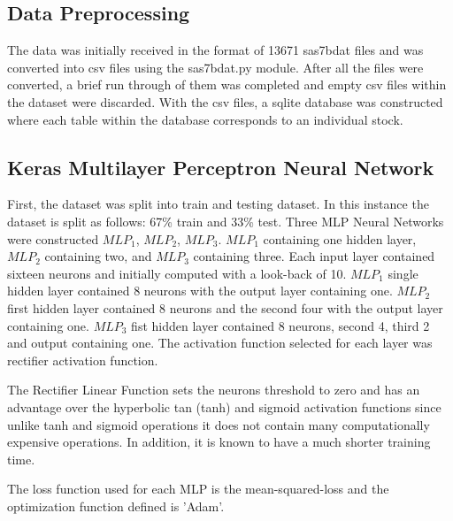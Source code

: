 \subsection{Data Preprocessing}\label{sec:data}


The data was initially received in the format of 13671 sas7bdat files and was converted into csv files using the sas7bdat.py module. After all the files were converted, a brief run through of them was completed and empty csv files within the dataset were discarded. With the csv files, a sqlite database was constructed where each table within the database corresponds to an individual stock. 

\subsection{Keras Multilayer Perceptron Neural Network}\label{sec:data}

First, the dataset was split into train and testing dataset. In this instance the dataset is split as follows: 67\% train and 33\% test. Three MLP Neural Networks were constructed $MLP_1$, $MLP_2$, $MLP_3$. $MLP_1$ containing one hidden layer, $MLP_2$ containing two, and $MLP_3$ containing three. Each input layer contained sixteen neurons and initially computed with a look-back of 10. $MLP_1$ single hidden layer contained 8 neurons with the output layer containing one. $MLP_2$ first hidden layer contained 8 neurons and the second four with the output layer containing one. $MLP_3$ fist hidden layer contained 8 neurons, second 4, third 2 and output containing one. The activation function selected for each layer was rectifier activation function. \cite{brownlee_2017_1}

The Rectifier Linear Function sets the neurons threshold to zero and has an advantage over the hyperbolic tan (tanh) and sigmoid activation functions since unlike tanh and sigmoid operations it does not contain many computationally expensive operations. In addition, it is known  to have a much shorter training time. 

The loss function used for each MLP is the mean-squared-loss and the optimization function defined is 'Adam'.

